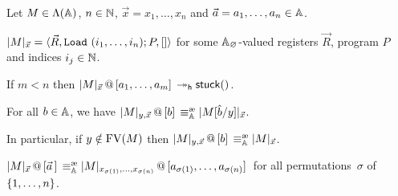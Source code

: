 \begin{lem}\label{lemma:aboutcatint}
Let $M\in\Lam(\Addrs)$, $n\in\nat$, $\vec x = x_1,\dots,x_n$ and $\vec a = a_1,\dots,a_n\in\Addrs$.
\bsub
\item\label{lemma:aboutcatint1}
	$\CInt[\vec x]{M} = \tuple{\vec R,\RaS (i_1,\dots,i_n);P,[]}$ for some $\Addrs_\Null$-valued registers $\vec R$, program $P$ and indices $i_j\in\nat$.
\item\label{lemma:aboutcatint2}
	If $m<n$ then $\append{\CInt[\vec x]{M}}{a_1,\dots,a_m}\reddh \stuck{}$.
\item\label{lemma:aboutcatint3}
	For all $b\in\Addrs$, we have $\append{\CInt[y,\vec x]{M}}{b} \equivea \CInt[\vec x]{M\subst{y}{\cons b}}$.
\item\label{lemma:aboutcatint4}
	In particular, if $y\notin\FV{M}$ then $\append{\CInt[y,\vec x]{M}}{b} \equivea \CInt{M}$.
\item\label{lemma:aboutcatint5}
	$\append{\CInt{M}}{\vec a\,} \equivea \append{\CInt[x_{\sigma(1)},\dots,x_{\sigma(n)}]{M}}{a_{\sigma(1)},\dots,a_{\sigma(n)}}$ for all permutations~$\sigma$ of $\set{1,\dots,n}$.
\esub
\end{lem}

